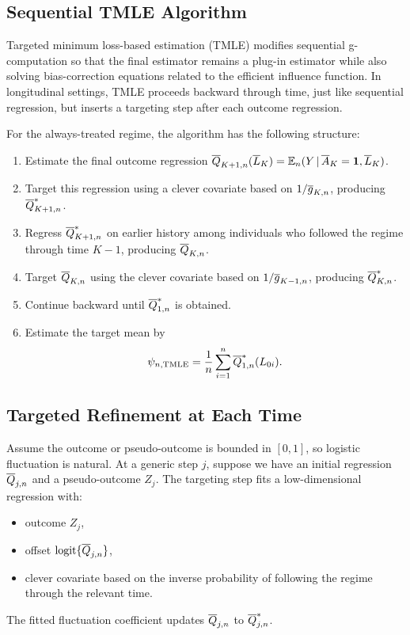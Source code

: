 \label{lec:8-9}

\subsection{Sequential TMLE Algorithm}

Targeted minimum loss-based estimation (TMLE) modifies sequential
g-computation so that the final estimator remains a plug-in estimator while also
solving bias-correction equations related to the efficient influence function.
In longitudinal settings, TMLE proceeds backward through time, just like
sequential regression, but inserts a targeting step after each outcome
regression.

For the always-treated regime, the algorithm has the following structure:
\begin{enumerate}
  \item Estimate the final outcome regression
  $\overline{Q}_{K+1,n}(\overline{L}_K)=\mathbb{E}_n(Y\,\vert\, \overline{A}_K=\mathbf{1},\overline{L}_K)$.
  \item Target this regression using a clever covariate based on
  $1/\overline{g}_{K,n}$, producing $\overline{Q}_{K+1,n}^*$.
  \item Regress $\overline{Q}_{K+1,n}^*$ on earlier history among individuals who
  followed the regime through time $K-1$, producing $\overline{Q}_{K,n}$.
  \item Target $\overline{Q}_{K,n}$ using the clever covariate based on
  $1/\overline{g}_{K-1,n}$, producing $\overline{Q}_{K,n}^*$.
  \item Continue backward until $\overline{Q}_{1,n}^*$ is obtained.
  \item Estimate the target mean by
  \[
    \psi_{n,\operatorname{TMLE}}=\frac{1}{n}\sum_{i=1}^n \overline{Q}_{1,n}^*(L_{0i}).
  \]
\end{enumerate}

\subsection{Targeted Refinement at Each Time}

Assume the outcome or pseudo-outcome is bounded in $[0,1]$, so logistic
fluctuation is natural. At a generic step $j$, suppose we have an initial
regression $\overline{Q}_{j,n}$ and a pseudo-outcome $Z_j$. The targeting step fits a
low-dimensional regression with:
\begin{itemize}
  \item outcome $Z_j$,
  \item offset $\operatorname{logit}\{\overline{Q}_{j,n}\}$,
  \item clever covariate based on the inverse probability of following the
  regime through the relevant time.
\end{itemize}
The fitted fluctuation coefficient updates $\overline{Q}_{j,n}$ to
$\overline{Q}_{j,n}^*$.

